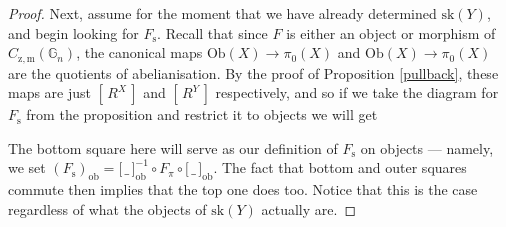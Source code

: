 \documentclass{amsart} %
\newenvironment{eq*}{\begin{equation*}}{\end{equation*}}
\begin{document}
\begin{proof}
Next, assume for the moment that we have already determined $\mathrm{sk}(Y)$, and begin looking for $F_{\mathrm{s}}$. Recall that since $F$ is either an object or morphism of $C_{\mathrm{z}, \mathrm{m}}(\mathbb{G}_n)$, the canonical maps $\mathrm{Ob}(X) \to \pi_0(X)$ and $\mathrm{Ob}(X) \to \pi_0(X)$ are the quotients of abelianisation. By the proof of Proposition \ref{pullback}, these maps are just $[ \, R^X \, ]$ and $[ \, R^Y \, ]$ respectively, and so if we take the diagram for $F_{\mathrm{s}}$ from the proposition and restrict it to objects we will get
\begin{eq*}  \end{eq*}
The bottom square here will serve as our definition of $F_{\mathrm{s}}$ on objects --- namely, we set $(F_{\mathrm{s}})_{\mathrm{ob}} = \lbrack \, \_ \, \rbrack_{\mathrm{ob}}^{-1} \circ F_\pi \circ \lbrack \, \_ \, \rbrack_{\mathrm{ob}}$. The fact that bottom and outer squares commute then implies that the top one does too. Notice that this is the case regardless of what the objects of $\mathrm{sk}(Y)$ actually are.


\end{proof}
\end{document}
